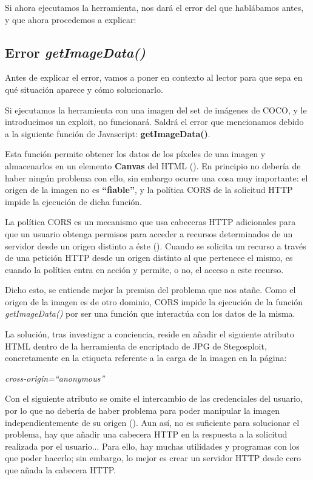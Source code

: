 Si ahora ejecutamos la herramienta, nos dará el error del que hablábamos antes, y que ahora procedemos a explicar:

\subsection{Error \textit{getImageData()}}

Antes de explicar el error, vamos a poner en contexto al lector para que sepa en qué situación aparece y cómo solucionarlo.


Si ejecutamos la herramienta con una imagen del set de imágenes de COCO, y le introducimos un exploit, no funcionará. Saldrá el error que mencionamos debido a la siguiente función de Javascript: \textbf{getImageData()}.

Esta función permite obtener los datos de los píxeles de una imagen y almacenarlos en un elemento \textbf{Canvas} del HTML (\cite{getimagedata}). En principio no debería de haber ningún problema con ello, sin embargo ocurre una cosa muy importante: el origen de la imagen no es \textbf{``fiable''}, y la política \ac{CORS} de la solicitud HTTP impide la ejecución de dicha función. %

La política \ac{CORS} es un mecanismo que usa cabeceras HTTP adicionales para que un usuario obtenga permisos para acceder a recursos determinados de un servidor desde un origen distinto a éste (\cite{CORS}). Cuando se solicita un recurso a través de una petición HTTP desde un origen distinto al que pertenece el mismo, es cuando la política entra en acción y permite, o no, el acceso a este recurso. %

Dicho esto, se entiende mejor la premisa del problema que nos atañe. Como el origen de la imagen es de otro dominio, \ac{CORS} impide la ejecución de la función \textit{getImageData()} por ser una función que interactúa con los datos de la misma.

La solución, tras investigar a conciencia, reside en añadir el siguiente atributo HTML dentro de la herramienta de encriptado de JPG de Stegosploit, concretamente en la etiqueta referente a la carga de la imagen en la página:

\begin{center}
\textit{cross-origin=``anonymous''}
\end{center}

Con el siguiente atributo se omite el intercambio de las credenciales del usuario, por lo que no debería de haber problema para poder manipular la imagen independientemente de su origen (\cite{cross-origin-anonymous}). Aun así, no es suficiente para solucionar el problema, hay que añadir una cabecera HTTP en la respuesta a la solicitud realizada por el usuario... Para ello, hay muchas utilidades y programas con los que poder hacerlo; sin embargo, lo mejor es crear un servidor HTTP desde cero que añada la cabecera HTTP. %

